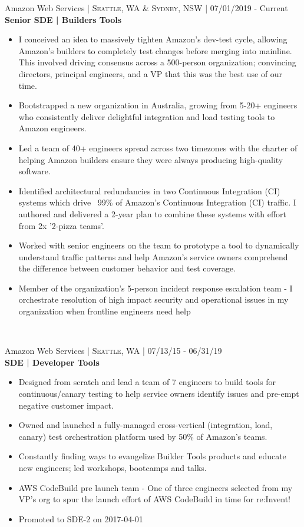 \documentclass[10pt]{article} %
\begin{document}
{{\raggedright\large Amazon Web Services \normalsize\textsc{ | Seattle, WA & Sydney, NSW} | 07/01/2019 - Current\\
\textbf{Senior SDE | Builders Tools}\\[5pt]}
\begin{itemize}\itemsep-0.25em
    \item I conceived an idea to massively tighten Amazon's dev-test cycle, allowing Amazon's builders to completely test changes before merging into mainline. This involved driving consensus across a 500-person organization; convincing directors, principal engineers, and a VP that this was the best use of our time.
    \item Bootstrapped a new organization in Australia, growing from 5-20+ engineers who consistently deliver delightful integration and load testing tools to Amazon engineers.
    \item Led a team of 40+ engineers spread across two timezones with the charter of helping Amazon builders ensure they were always producing high-quality software.
    \item Identified architectural redundancies in two Continuous Integration (CI) systems which drive ~99\% of Amazon's Continuous Integration (CI) traffic. I authored and delivered a 2-year plan to combine these systems with effort from 2x '2-pizza teams'.
    \item Worked with senior engineers on the team to prototype a tool to dynamically understand traffic patterns and help Amazon's service owners comprehend the difference between customer behavior and test coverage.
    \item Member of the organization's 5-person incident response escalation team - I orchestrate resolution of high impact security and operational issues in my organization when frontline engineers need help
\end{itemize}\\


{\raggedright\large Amazon Web Services \normalsize\textsc{ | Seattle, WA} | 07/13/15 - 06/31/19\\
\textbf{SDE | Developer Tools}\\[5pt]}
\begin{itemize}\itemsep-0.25em
    \item Designed from scratch and lead a team of 7 engineers to build tools for continuous/canary testing to help service owners identify issues and pre-empt negative customer impact.
    \item Owned and launched a fully-managed cross-vertical (integration, load, canary) test orchestration platform used by 50\% of Amazon's teams.
    \item Constantly finding ways to evangelize Builder Tools products and educate new engineers; led workshops, bootcamps and talks.
    \item AWS CodeBuild pre launch team - One of three engineers selected from my VP's org to spur the launch effort of AWS CodeBuild in time for re:Invent!
    \item Promoted to SDE-2 on 2017-04-01
\end{itemize}\\

}
\end{document}
